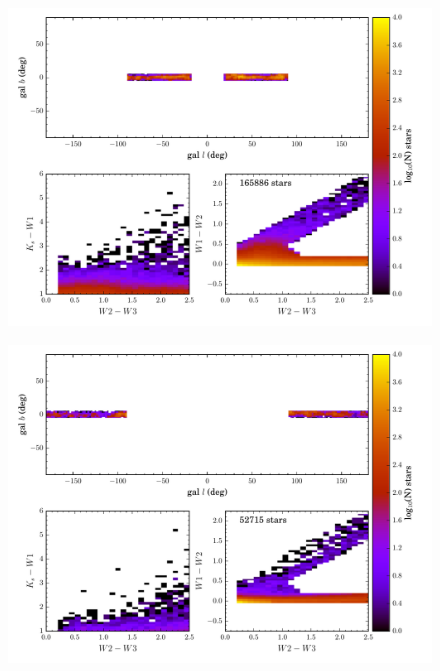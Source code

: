 \begin{figure}[h]
\includegraphics[width=6.5in]{figs/color_and_map_candidates_region1.pdf}
\caption{\label{fig:color_map_candidates1}}
\end{figure}

\begin{figure}[h]
\includegraphics[width=6.5in]{figs/color_and_map_candidates_region2.pdf}
\caption{\label{fig:color_map_candidates2}}
\end{figure}

